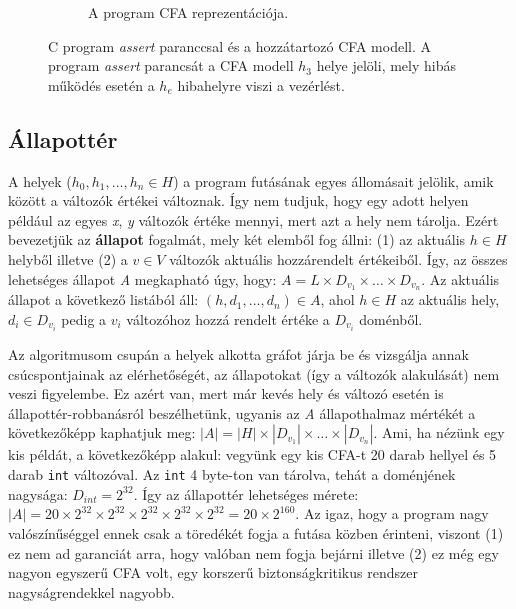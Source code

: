 \begin{example}
\begin{figure}[!htb]
\begin{subfigure}[b]{.56\linewidth}
			\caption{A program CFA reprezentációja.}
			\label{fig:assert2}
		\end{subfigure}
		\caption{C program \emph{assert} paranccsal és a hozzátartozó CFA modell. A program \emph{assert} parancsát a CFA modell $h_3$ helye jelöli, mely hibás működés esetén a $h_e$ hibahelyre viszi a vezérlést.}
		\label{fig:assert}
	\end{figure}
\end{example}

\subsection{Állapottér}

A helyek ($ h_0, h_1, \ldots, h_n \in H $) a program futásának egyes állomásait jelölik, amik között a változók értékei változnak. Így nem tudjuk, hogy egy adott helyen például az egyes \textit{x}, \textit{y} változók értéke mennyi, mert azt a hely nem tárolja. Ezért bevezetjük az \textbf{állapot} fogalmát, mely két elemből fog állni: (1) az aktuális $ h \in H $ helyből illetve (2) a $ v \in V $ változók aktuális hozzárendelt értékeiből. Így, az összes lehetséges állapot \textit{A} megkapható úgy, hogy: $ A = L \times D_{v_1} \times \ldots \times D_{v_n} $. Az aktuális állapot a következő listából áll: $ (h, d_1, \ldots, d_n) \in A $, ahol $ h \in H $ az aktuális hely, $ d_i \in D_{v_i} $ pedig a $ v_i $ változóhoz hozzá rendelt értéke a $ D_{v_i} $ doménből.

Az algoritmusom csupán a helyek alkotta gráfot járja be és vizsgálja annak csúcspontjainak az elérhetőségét, az állapotokat (így a változók alakulását) nem veszi figyelembe. Ez azért van, mert már kevés hely és változó esetén is állapottér-robbanásról beszélhetünk, ugyanis az \textit{A} állapothalmaz mértékét a következőképp kaphatjuk meg: $ |A| = |H| \times |D_{v_1}| \times \ldots \times |D_{v_n}| $. Ami, ha nézünk egy kis példát, a következőképp alakul: vegyünk egy kis CFA-t 20 darab hellyel és 5 darab \texttt{int} változóval. Az \texttt{int} 4 byte-ton van tárolva, tehát a doménjének nagysága: $ D_{\mathit{int}} = 2^{32} $. Így az állapottér lehetséges mérete: $ |A| = 20 \times 2^{32} \times 2^{32} \times 2^{32} \times 2^{32} \times 2^{32} = 20 \times 2^{160} $. Az igaz, hogy a program nagy valószínűséggel ennek csak a töredékét fogja a futása közben érinteni, viszont (1) ez nem ad garanciát arra, hogy valóban nem fogja bejárni illetve (2) ez még egy nagyon egyszerű CFA volt, egy korszerű biztonságkritikus rendszer nagyságrendekkel nagyobb.

